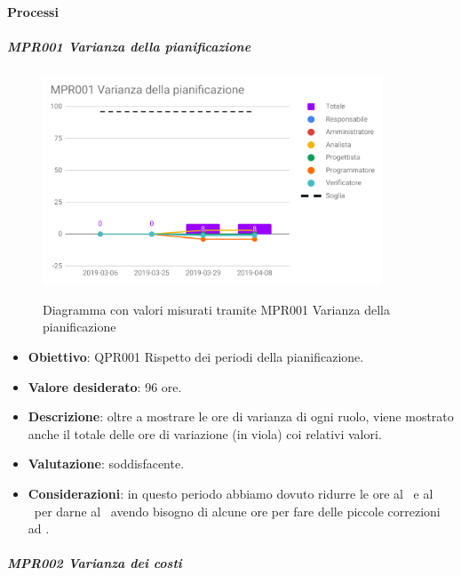 	\paragraph{Processi}
	
	\subparagraph{MPR001 Varianza della pianificazione}
	
	\begin{figure}[H]
		\centering
		\includegraphics[width=0.9\textwidth]{img/cruscotti/RQ/MPR001.png}
		\label{immagineVarianzaPianificazioneRP}
		\caption{Diagramma con valori misurati tramite MPR001 Varianza della pianificazione}
	\end{figure}
	
	\begin{itemize}
		\item \textbf{Obiettivo}: QPR001 Rispetto dei periodi della pianificazione.
		\item \textbf{Valore desiderato}: 96 ore.
		\item \textbf{Descrizione}: oltre a mostrare le ore di varianza di ogni ruolo, viene mostrato anche il totale delle ore di variazione (in viola) coi relativi valori.
		\item \textbf{Valutazione}: soddisfacente.
		\item \textbf{Considerazioni}: in questo periodo abbiamo dovuto ridurre le ore al
		\Progr\ e al \Ver\ per darne al \Ana\ avendo bisogno di alcune ore per fare delle piccole correzioni
		ad \AdRv.
	\end{itemize}

		\subparagraph{MPR002 Varianza dei costi}
	
